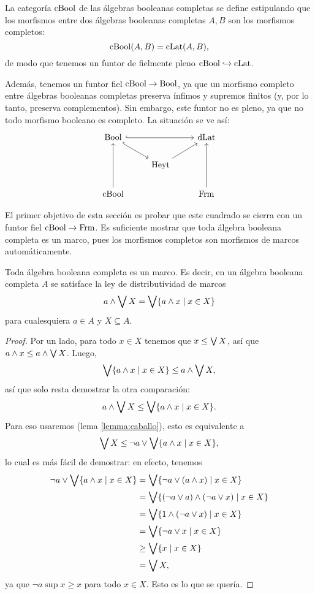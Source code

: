 La categoría $\mathrm{cBool}$ de las álgebras booleanas completas se define
estipulando que los morfismos entre dos álgebras booleanas
completas $A,B$ son los morfismos completos:
\[
  \mathrm{cBool}(A,B)=\mathrm{cLat}(A,B)
,\]
de modo que tenemos un funtor de fielmente pleno
$\mathrm{cBool}\hookrightarrow\mathrm{cLat}$.

Además, tenemos un funtor fiel $\mathrm{cBool}\to\mathrm{Bool}$, ya que un morfismo
completo entre álgebras booleanas completas preserva ínfimos y
supremos finitos (y, por lo tanto, preserva complementos).
Sin embargo, este funtor no es pleno, ya que no todo morfismo booleano
es completo.
La situación se ve así:
\begin{equation}\label{diag:cuadrado-incompleto}
\begin{tikzcd}
  \Bool \ar[dr,hook] \ar[rr,hook] &               & \DLat \\
                                  & \Heyt \ar[ur]         \\
  \CBA \ar[uu] &           & \Frm \ar[uu]
\end{tikzcd}
\end{equation}

El primer objetivo de esta sección es probar que este cuadrado se
cierra con un funtor fiel $\mathrm{cBool}\to\mathrm{Frm}$.
Es suficiente mostrar que toda álgebra booleana completa es un marco,
pues los morfismos completos son morfismos de marcos automáticamente.

\begin{lemma}
    Toda álgebra booleana completa es un marco.
    Es decir, en un álgebra booleana completa $A$ se satisface la
    ley de distributividad de marcos
    \[
        a\wedge\bigvee X = \bigvee\{a\wedge x\mid x\in X\}
    \]
    para cualesquiera $a\in A$ y $X\subseteq A$.
\end{lemma}
\begin{proof}
    Por un lado, para todo $x\in X$ tenemos que $x\leq\bigvee X$, así que
    $a\wedge x\leq a\wedge\bigvee X$.
    Luego,
    \[
        \bigvee\{a\wedge x\mid x\in X\} \leq a\wedge\bigvee X
    ,\]
    así que solo resta demostrar la otra comparación:
    \[
        a\wedge\bigvee X \leq \bigvee\{a\wedge x\mid x\in X\}
    .\]
    Para eso usaremos (lema \ref{lemma:caballo}),
    esto es equivalente a
    \[
        \bigvee X \leq \neg a\vee \bigvee\{a\wedge x\mid x\in X\}
    ,\]
    lo cual es más fácil de demostrar: en efecto, tenemos
    \begin{align*}
        \neg a\vee\bigvee\{a\wedge x\mid x\in X\}
        &= \bigvee\{\neg a \vee(a\wedge x) \mid x\in X\} \\
        &= \bigvee\{(\neg a\vee a)\wedge(\neg a\vee x) \mid x\in X\} \\
        &= \bigvee\{1\wedge(\neg a\vee x) \mid x\in X\} \\
        &= \bigvee\{\neg a\vee x \mid x\in X\} \\
        &\geq \bigvee\{x \mid x\in X\} \\
        &= \bigvee X,
    \end{align*}
    ya que $\neg a\sup x\geq x$ para todo $x\in X$.
    Esto es lo que se quería.
\end{proof}

